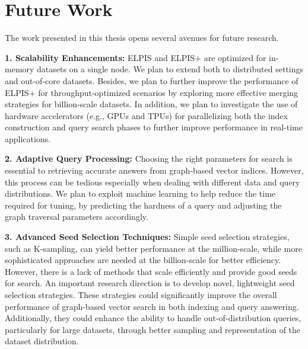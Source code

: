 
\section{Future Work}
The work presented in this thesis opens several avenues for future research. 

\textbf{1. Scalability Enhancements:} ELPIS and ELPIS+ are optimized for in-memory datasets on a single node. We plan to extend both to distributed settings and out-of-core datasets. 
Besides, we plan to further improve the performance of ELPIS+ for throughput-optimized scenarios by exploring more effective merging strategies for billion-scale datasets.
In addition, we plan to investigate the use of hardware accelerators (e.g., GPUs and TPUs) for parallelizing both the index construction and query search phases to further improve performance in real-time applications.


\textbf{2. Adaptive Query Processing:} Choosing the right parameters for search is essential to retrieving accurate answers from graph-based vector indices. However, this process can be tedious 
especially when dealing with different data and query distributions. We plan to exploit machine learning to help reduce the time required for tuning, by predicting the hardness of a query and adjusting the graph traversal parameters accordingly.

\textbf{3. Advanced Seed Selection Techniques:}  Simple seed selection strategies, such as K-sampling, can yield better performance at the million-scale, while more sophisticated approaches are needed at the billion-scale for better efficiency. However, there is a lack of methods that scale efficiently and provide good seeds for search. An important research direction is to develop novel, lightweight seed selection strategies. These strategies could significantly improve the overall performance of graph-based vector search in both indexing and query answering. Additionally, they could enhance the ability to handle out-of-distribution queries, particularly for large datasets, through better sampling and representation of the dataset distribution.

